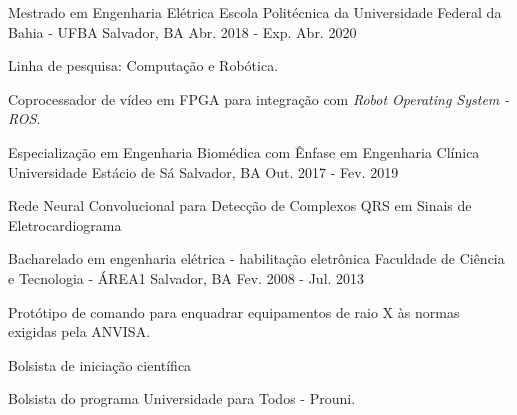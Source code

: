 

\begin{cventries}

  \cventry
    {Mestrado em Engenharia Elétrica} %
    {Escola Politécnica da Universidade Federal da Bahia - UFBA} %
    {Salvador, BA} %
    {Abr. 2018 - Exp. Abr. 2020} %
    {
      \begin{cvitems} %
        \item {Linha de pesquisa: Computação e Robótica.}
        \item {Coprocessador de vídeo em FPGA para integração com \textit{Robot Operating System - ROS}.}
      \end{cvitems}
    }


  \cventry
    {Especialização em Engenharia Biomédica com Ênfase em Engenharia Clínica} %
    {Universidade Estácio de Sá} %
    {Salvador, BA} %
    {Out. 2017 - Fev. 2019} %
    {
      \begin{cvitems} %
        \item {Rede Neural Convolucional para Detecção de Complexos QRS em Sinais de Eletrocardiograma}
      \end{cvitems}
    }


  \cventry
    {Bacharelado em engenharia elétrica - habilitação eletrônica} %
    {Faculdade de Ciência e Tecnologia - ÁREA1} %
    {Salvador, BA} %
    {Fev. 2008 - Jul. 2013} %
    {
      \begin{cvitems} %
        \item {Protótipo de comando para enquadrar equipamentos de raio X às normas exigidas pela ANVISA.}
        \item {Bolsista de iniciação científica}
        \item {Bolsista do programa Universidade para Todos - Prouni.}
      \end{cvitems}
    }


\end{cventries}
